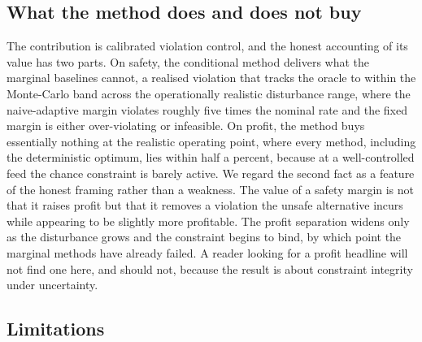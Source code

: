 \documentclass[review,times]{elsarticle}
\begin{document}
\subsection{What the method does and does not buy}

The contribution is calibrated violation control, and the honest accounting of its value has two
parts. On safety, the conditional method delivers what the marginal baselines cannot, a realised
violation that tracks the oracle to within the Monte-Carlo band across the operationally
realistic disturbance range, where the naive-adaptive margin violates roughly five times the
nominal rate and the fixed margin is either over-violating or infeasible. On profit, the method
buys essentially nothing at the realistic operating point, where every method, including the
deterministic optimum, lies within half a percent, because at a well-controlled feed the chance
constraint is barely active. We regard the second fact as a feature of the honest framing rather
than a weakness. The value of a safety margin is not that it raises profit but that it removes a
violation the unsafe alternative incurs while appearing to be slightly more profitable. The
profit separation widens only as the disturbance grows and the constraint begins to bind, by
which point the marginal methods have already failed. A reader looking for a profit headline will
not find one here, and should not, because the result is about constraint integrity under
uncertainty.

\subsection{Limitations}
\end{document}
